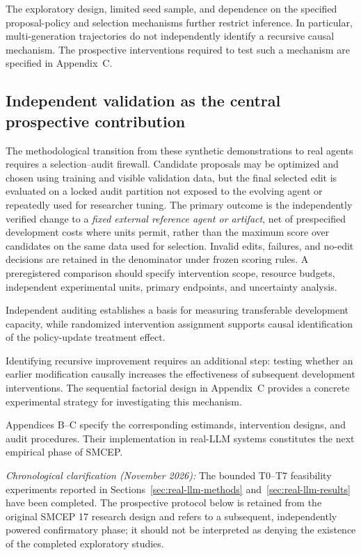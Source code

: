 \documentclass[11pt,a4paper]{article}
\begin{document}
The exploratory design, limited seed sample, and dependence on the specified proposal-policy and
selection mechanisms further restrict inference. In particular, multi-generation trajectories
do not independently identify a recursive causal mechanism. The prospective interventions required
to test such a mechanism are specified in Appendix~C.

\subsection{Independent validation as the central prospective contribution}\label{sec:validationprotocol}
The methodological transition from these synthetic demonstrations to real agents requires a selection--audit firewall. Candidate proposals may be optimized and chosen using training and visible validation data, but the final selected edit is evaluated on a locked audit partition not exposed to the evolving agent or repeatedly used for researcher tuning. The primary outcome is the independently verified change to a \emph{fixed external reference agent or artifact}, net of prespecified development costs where units permit, rather than the maximum score over candidates on the same data used for selection. Invalid edits, failures, and no-edit decisions are retained in the denominator under frozen scoring rules. A preregistered comparison should specify intervention scope, resource budgets, independent experimental units, primary endpoints, and uncertainty analysis.

Independent auditing establishes a basis for measuring transferable development capacity, while randomized intervention assignment supports causal identification of the policy-update treatment effect.

Identifying recursive improvement requires an additional step: testing whether an earlier modification causally increases the effectiveness of subsequent development interventions. The sequential factorial
design in Appendix~C provides a concrete experimental strategy for investigating this mechanism.

Appendices B--C specify the corresponding estimands, intervention designs, and audit procedures. Their implementation in real-LLM systems constitutes the next empirical phase of SMCEP.

\noindent\textit{Chronological clarification (November 2026):} The bounded T0--T7 feasibility experiments reported in Sections~\ref{sec:real-llm-methods} and~\ref{sec:real-llm-results} have been completed. The prospective protocol below is retained from the original SMCEP 17 research design and refers to a subsequent, independently powered confirmatory phase; it should not be interpreted as denying the existence of the completed exploratory studies.
\end{document}
